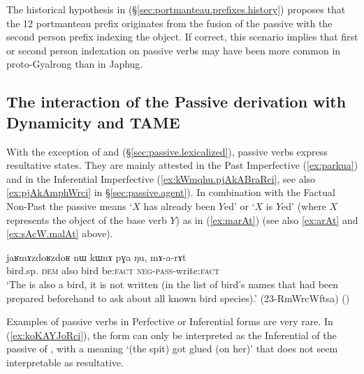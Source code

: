 The historical hypothesis in (§\ref{sec:portmanteau.prefixes.history}) proposes that the 1\fl{}2 portmanteau prefix  originates from the fusion of  the passive  with the second person  prefix indexing the object. If correct, this scenario implies that first or second person indexation on passive verbs may have been more common in proto-Gyalrong than in Japhug.

\subsection{The interaction of the Passive derivation with Dynamicity and TAME} \label{sec:passive.stative} 

With the exception of   and   (§\ref{sec:passive.lexicalized}), passive verbs express resultative states. They are mainly attested in the Past Imperfective (\ref{ex:parkua}) and in the Inferential Imperfective (\ref{ex:kWmqhu.pjAkABraRci}, see also \ref{ex:pjAkAmphWrci} in §\ref{sec:passive.agent}). In combination with the Factual Non-Past the passive means `$X$ has already been $Y$ed' or `$X$ is $Y$ed' (where $X$ represents the object of the base verb $Y$) as in (\ref{ex:marAt}) (see also \ref{ex:arAt} and \ref{ex:sAcW.malAt} above).

\begin{exe}
\ex \label{ex:marAt}
 \gll  jaʁmɤzdoʁzdoʁ nɯ kɯnɤ pɣa ŋu, mɤ-a-rɤt \\
 bird.sp. \textsc{dem} also bird be:\textsc{fact} \textsc{neg}-\textsc{pass}-write:\textsc{fact} \\
 \glt `The  is also a bird, it is not written (in the list of bird's names that had been prepared beforehand to ask about all known bird species).' (23-RmWrcWftsa) ()
\end{exe}

 Examples of passive verbs in Perfective or Inferential forms are very rare. In (\ref{ex:koKAYJoRci}), the form  can only be interpreted as the Inferential of the passive of , with a meaning `(the spit) got glued (on her)' that does not seem interpretable as resultative.
 
